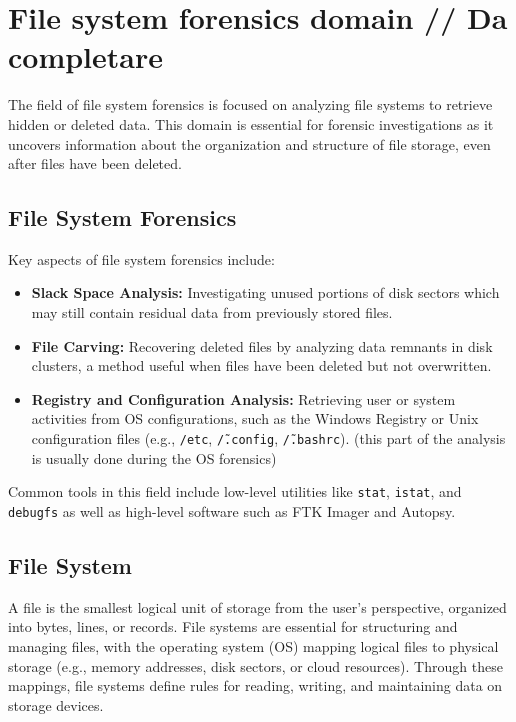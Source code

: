 \chapter{File system forensics domain // Da completare} 

The field of file system forensics is focused on analyzing file systems to retrieve hidden or deleted data. This domain is essential for forensic investigations as it uncovers information about the organization and structure of file storage, even after files have been deleted.

\section{File System Forensics}

Key aspects of file system forensics include:
\begin{itemize}
    \item \textbf{Slack Space Analysis:} Investigating unused portions of disk sectors which may still contain residual data from previously stored files.
    \item \textbf{File Carving:} Recovering deleted files by analyzing data remnants in disk clusters, a method useful when files have been deleted but not overwritten.
    \item \textbf{Registry and Configuration Analysis:} Retrieving user or system activities from OS configurations, such as the Windows Registry or Unix configuration files (e.g., \texttt{/etc}, \texttt{\~/.config}, \texttt{\~/.bashrc}). (this part of the analysis is usually done during the OS forensics)
\end{itemize}

Common tools in this field include low-level utilities like \texttt{stat}, \texttt{istat}, and \texttt{debugfs} as well as high-level software such as FTK Imager and Autopsy.

\section{File System}

A file is the smallest logical unit of storage from the user’s perspective, organized into bytes, lines, or records. File systems are essential for structuring and managing files, with the operating system (OS) mapping logical files to physical storage (e.g., memory addresses, disk sectors, or cloud resources). Through these mappings, file systems define rules for reading, writing, and maintaining data on storage devices.


